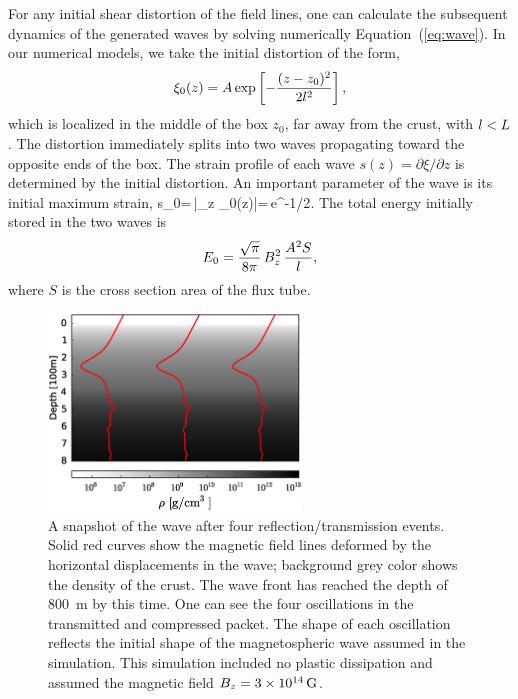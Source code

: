 For any initial shear distortion of the field lines, one can calculate the subsequent 
dynamics of the generated \alfven waves by solving numerically Equation~(\ref{eq:wave}). 
In our numerical models, we take the initial distortion of the form, 
\begin{equation}
    \xi_0(z) = A \exp\left[-\frac{(z-z_0)^2}{2l^2}\right],
\end{equation}
which is localized in the middle of the box $z_0$, far away from the crust, with 
$l< L$.
The distortion immediately splits into two waves propagating toward the opposite ends of the box. 
The strain profile of each wave $s(z)=\partial\xi/\partial z$ is determined by the initial distortion. 
An important parameter of the wave is its initial maximum strain,
\beq
   s_0=\,\max |\partial_z \xi_0(z)|=\,e^{-1/2}.
\eeq
The total energy initially stored in the two waves is
\begin{equation}
    E_{0}=\frac{\sqrt{\pi}}{8\pi}\,B_z^2\,\frac{A^2S}{l},
\end{equation}
where $S$ is the cross section area of the flux tube.

\begin{figure}[h]
\centering
\includegraphics[width=0.6\textwidth]{pics/chap3/fig4.eps} 
\caption[A snapshot of the wave after four reflection/transmission events]{A snapshot of the wave after four reflection/transmission events. 
Solid red curves show the magnetic field lines deformed by the horizontal displacements in the wave; background grey color shows the density of the crust. 
The wave front has reached the depth of 800~m by this time. 
One can see the four oscillations in the transmitted and compressed packet. 
The shape of each oscillation reflects the initial shape of the magnetospheric wave assumed in the simulation.
This simulation included no plastic dissipation and assumed the magnetic field $B_z = 3\times 10^{14}\,\rm G$.}
\label{fig4}
\end{figure}

